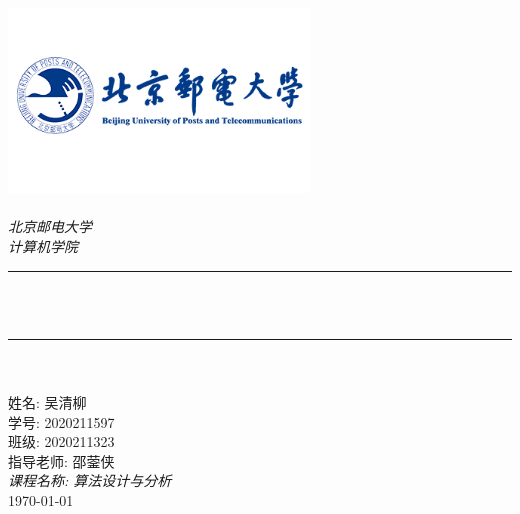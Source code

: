 \begin{titlepage}
    \newcommand{\HRule}{\rule{\linewidth}{0.5mm}}
    \includegraphics[width=8cm]{title/logo_bupt.png}\\[1cm]
    \center
    \quad\\[1.5cm]
    \textsl{\Large 北京邮电大学}\\[0.5cm]
    \textsl{\large  计算机学院}\\[0.5cm]
    \makeatletter
    \HRule \\[0.4cm]
    {\huge \bfseries \@title}\\[0.4cm]
    \HRule \\[1.5cm]
    ~\\[2cm] %

    \makeatother
    {\large 姓名: 吴清柳}\\[0.5cm]
    {\large 学号: 2020211597}\\[0.5cm]
    {\large 班级: 2020211323}\\[0.5cm]
    {\large 指导老师: 邵蓥侠}\\[0.5cm]
    {\large \emph{课程名称: 算法设计与分析}}\\[0.5cm]
    {\large \today}\\[2cm]
    \vfill
\end{titlepage}
